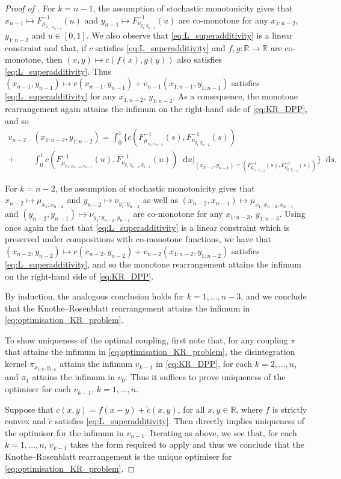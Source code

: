 \documentclass[oneside]{amsart}
\theoremstyle{definition}
\newcommand{\R}{\mathbb R}
\newcommand{\di}{\mathop{}\!\mathrm{d}}
\def\R{{\mathbb R}}
\numberwithin{equation}{section}
\begin{document}
\begin{proof}[Proof of ]
For $k=n-1$, the assumption of stochastic monotonicity gives that $x_{n-1}\mapsto F^{-1}_{\mu_{x_1:x_{n-1}}}(u)$ and $y_{n-1}\mapsto F^{-1}_{\nu_{y_1:y_{n-1}}}(u)$ are co-monotone for any $x_{1:n-2}$, $y_{1:n-2}$ and $u \in [0, 1]$. We also observe that \eqref{eq:L_superadditivity} is a linear constraint and that, if $c$ satisfies \eqref{eq:L_superadditivity} and $f, g \colon \R \to \R$ are co-monotone, then $(x,y)\mapsto c(f(x),g(y))$ also satisfies \eqref{eq:L_superadditivity}. Thus $(x_{n-1},y_{n-1})\mapsto c(x_{n-1},y_{n-1})+v_{n-1}(x_{1:n-1},y_{1:n-1})$ satisfies \eqref{eq:L_superadditivity} for any $x_{1:n-2}$, $y_{1:n-2}$.
As a consequence, the monotone rearrangement again attains the infimum on the right-hand side of \eqref{eq:KR_DPP}, and so
\begin{align}
v_{n-2} & (x_{1:n-2},y_{1:n-2})
=
\int_0^1 \bigg\{c\!\left(F^{-1}_{\mu_{x_1:x_{n-2}}}(s),F^{-1}_{\nu_{y_1:y_{n-2}}}(s)\right)\\
+&
\int_0^1 c\!\left(F^{-1}_{\mu_{x_1:x_{n-2},x_{n-1}}}(u),F^{-1}_{\nu_{y_1:y_{n-2},y_{n-1}}}(u)\right)\di u\Big|_{(x_{n-1},y_{n-1})=\!\left(F^{-1}_{\mu_{x_1:x_{n-2}}}(s),F^{-1}_{\nu_{y_1:y_{n-2}}}(s)\right)}\bigg\}\di s.
\end{align}

For $k=n-2$, the assumption of stochastic monotonicity gives that $x_{n-2}\mapsto \mu_{x_1:x_{n-2}}$ and $y_{n-2}\mapsto \nu_{y_1:y_{n-2}}$ as well as $(x_{n-2},x_{n-1})\mapsto \mu_{x_1:x_{n-2},x_{n-1}}$ and $(y_{n-2},y_{n-1})\mapsto \nu_{y_1:y_{n-2},y_{n-1}}$ are co-monotone for any $x_{1:n-3}$, $y_{1:n-3}$. Using once again the fact that \eqref{eq:L_superadditivity} is a linear constraint which is preserved under compositions with co-monotone functions, we have that $(x_{n-2},y_{n-2})\mapsto c(x_{n-2},y_{n-2})+v_{n-2}(x_{1:n-2},y_{1:n-2})$ satisfies \eqref{eq:L_superadditivity}, and so the monotone rearrangement attains the infimum on the right-hand side of \eqref{eq:KR_DPP}. 

By induction, the analogous conclusion holds for $k=1,\dots,n-3$, and we conclude that the Knothe--Rosenblatt rearrangement attains the infimum in \eqref{eq:optimisation_KR_problem}.

To show uniqueness of the optimal coupling, first note that, for any coupling $\pi$ that attains the infimum in \eqref{eq:optimisation_KR_problem}, the disintegration kernel $\pi_{x_{1:k}, y_{1:k}}$ attains the infimum $v_{k - 1}$ in \eqref{eq:KR_DPP}, for each $k = 2, \dotsc, n$, and $\pi_1$ attains the infimum in $v_0$. Thus it suffices to prove uniqueness of the optimiser for each $v_{k - 1}$, $k = 1, \dotsc, n$.

Suppose that $c(x, y) = f(x - y) + \tilde c(x, y)$, for all $x, y \in \R$, where $f$ is strictly convex and $\tilde c$ satisfies \eqref{eq:L_superadditivity}. Then  directly implies uniqueness of the optimiser for the infimum in $v_{n - 1}$. Iterating as above, we see that, for each $k = 1, \dotsc, n$, $v_{k -1}$ takes the form required to apply  and thus we conclude that the Knothe--Rosenblatt rearrangement is the unique optimiser for \eqref{eq:optimisation_KR_problem}.
\end{proof}
\end{document}
